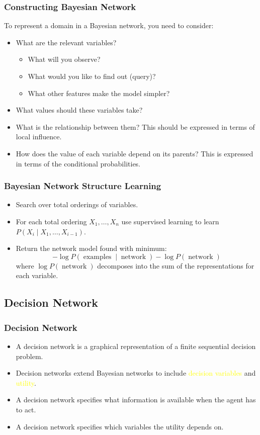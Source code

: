 \documentclass[UTF8,11pt,colorlinks,compress,openany]{beamer}%
\begin{document}
\begin{frame}\frametitle{Constructing Bayesian Network}
To represent a domain in a Bayesian network, you need to
consider:
\begin{itemize}
	\item What are the relevant variables?
	\begin{itemize}
		\item What will you observe?
		\item What would you like to find out (query)?
		\item What other features make the model simpler?
	\end{itemize}
	\item What values should these variables take?
	\item What is the relationship between them? This should be expressed in terms of local influence.
	\item How does the value of each variable depend on its parents? This is expressed in terms of the conditional probabilities.
\end{itemize}
\end{frame}

\begin{frame}\frametitle{Bayesian Network Structure Learning}
\begin{itemize}
	\item Search over total orderings of variables.
	\item For each total ordering $X_1,\dots,X_n$ use supervised learning to learn $P(X_i\mid X_1,\dots,X_{i-1})$.
	\item Return the network model found with minimum:
	\[-\log P(\operatorname{examples}\mid\operatorname{network}) - \log P(\operatorname{network})\]
	where $\log P(\operatorname{network})$ decomposes into the sum of the representations for each variable.
\end{itemize}
\end{frame}

\subsection{Decision Network}

\begin{frame}\frametitle{Decision Network}
\begin{itemize}
	\item A decision network is a graphical representation of a finite sequential decision problem.
	\item Decision networks extend Bayesian networks to include \textcolor{yellow}{decision variables} and \textcolor{yellow}{utility}.
	\item A decision network specifies what information is available when the agent has to act.
	\item A decision network specifies which variables the utility depends on.
\end{itemize}
\end{frame}
\end{document}

